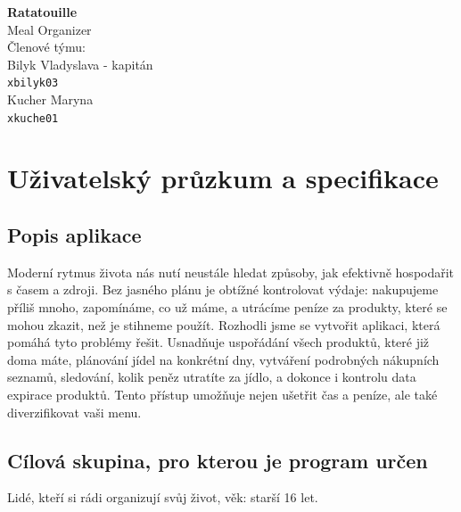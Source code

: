 \documentclass[a4paper,12pt]{article}
\begin{document}
\begin{titlepage}
    \centering
    \vspace*{\fill}
    {\LARGE \textbf{Ratatouille}}\\[0.3cm]
    Meal Organizer\\[1.5cm]
    Členové týmu:\\[0.5cm]
    Bilyk Vladyslava - kapitán \\
    \texttt{xbilyk03} \\[0.5cm]
    Kucher Maryna \\
    \texttt{xkuche01} 
    \vspace*{\fill}
\end{titlepage}

\newpage

\section*{Uživatelský průzkum a specifikace}

\subsection*{Popis aplikace}
    Moderní rytmus života nás nutí neustále hledat způsoby, jak efektivně hospodařit s časem a zdroji. Bez jasného plánu je obtížné kontrolovat výdaje: nakupujeme příliš mnoho, zapomínáme, co už máme, a utrácíme peníze za produkty, které se mohou zkazit, než je stihneme použít. Rozhodli jsme se vytvořit aplikaci, která pomáhá tyto problémy řešit. Usnadňuje uspořádání všech produktů, které již doma máte, plánování jídel na konkrétní dny, vytváření podrobných nákupních seznamů, sledování, kolik peněz utratíte za jídlo, a dokonce i kontrolu data expirace produktů. Tento přístup umožňuje nejen ušetřit čas a peníze, ale také diverzifikovat vaši menu.

\subsection*{Cílová skupina, pro kterou je program určen}
    Lidé, kteří si rádi organizují svůj život, věk: starší 16 let.
    
\end{document}
